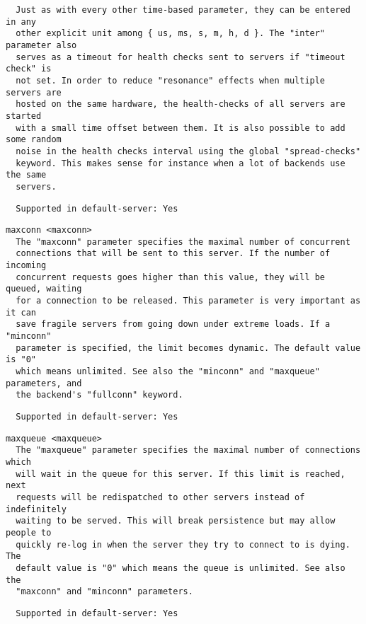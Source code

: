 \begin{verbatim}
  Just as with every other time-based parameter, they can be entered in any
  other explicit unit among { us, ms, s, m, h, d }. The "inter" parameter also
  serves as a timeout for health checks sent to servers if "timeout check" is
  not set. In order to reduce "resonance" effects when multiple servers are
  hosted on the same hardware, the health-checks of all servers are started
  with a small time offset between them. It is also possible to add some random
  noise in the health checks interval using the global "spread-checks"
  keyword. This makes sense for instance when a lot of backends use the same
  servers.
\end{verbatim}

\begin{verbatim}
  Supported in default-server: Yes
\end{verbatim}

\begin{verbatim}
maxconn <maxconn>
  The "maxconn" parameter specifies the maximal number of concurrent
  connections that will be sent to this server. If the number of incoming
  concurrent requests goes higher than this value, they will be queued, waiting
  for a connection to be released. This parameter is very important as it can
  save fragile servers from going down under extreme loads. If a "minconn"
  parameter is specified, the limit becomes dynamic. The default value is "0"
  which means unlimited. See also the "minconn" and "maxqueue" parameters, and
  the backend's "fullconn" keyword.
\end{verbatim}

\begin{verbatim}
  Supported in default-server: Yes
\end{verbatim}

\begin{verbatim}
maxqueue <maxqueue>
  The "maxqueue" parameter specifies the maximal number of connections which
  will wait in the queue for this server. If this limit is reached, next
  requests will be redispatched to other servers instead of indefinitely
  waiting to be served. This will break persistence but may allow people to
  quickly re-log in when the server they try to connect to is dying. The
  default value is "0" which means the queue is unlimited. See also the
  "maxconn" and "minconn" parameters.
\end{verbatim}

\begin{verbatim}
  Supported in default-server: Yes
\end{verbatim}

